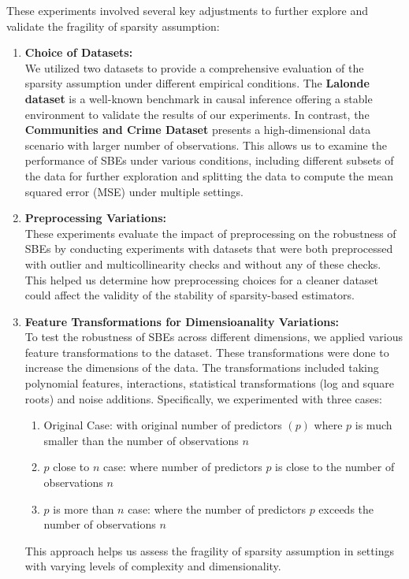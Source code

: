 These experiments involved several key adjustments to further explore and validate the fragility of sparsity assumption:

\begin{enumerate}
    \item \textbf{Choice of Datasets:}\\
    We utilized two datasets to provide a comprehensive evaluation of the sparsity assumption under different empirical conditions. The \textbf{Lalonde dataset} is a well-known benchmark in causal inference offering a stable environment to validate the results of our experiments. In contrast, the \textbf{Communities and Crime Dataset} presents a high-dimensional data scenario with larger number of observations. This allows us to examine the performance of SBEs under various conditions, including different subsets of the data for further exploration and splitting the data to compute the mean squared error (MSE) under multiple settings. 

    \item \textbf{Preprocessing Variations:}\\
    These experiments evaluate the impact of preprocessing on the robustness of SBEs by conducting experiments with datasets that were both preprocessed with outlier and multicollinearity checks and without any of these checks. This helped us determine how preprocessing choices for a cleaner dataset could affect the validity of the stability of sparsity-based estimators. 

    \item \textbf{Feature Transformations for Dimensioanality Variations:}\\
    To test the robustness of SBEs across different dimensions, we applied various feature transformations to the dataset.  These transformations were done to increase the dimensions of the data. The  transformations included taking polynomial features, interactions, statistical transformations (log and square roots) and noise additions. Specifically, we experimented with three cases: 
    \begin{enumerate}
        \item Original Case: with original number of predictors $(p)$ where $p$ is much smaller than the number of observations $n$
        \item $p$ close to $n$ case: where number of predictors $p$ is close to the number of observations $n$
        \item $p$ is more than $n$ case: where the number of predictors $p$ exceeds the number of observations $n$
    \end{enumerate}
    This approach helps us assess the fragility of sparsity assumption in settings with varying levels of complexity and dimensionality.


\end{enumerate}
